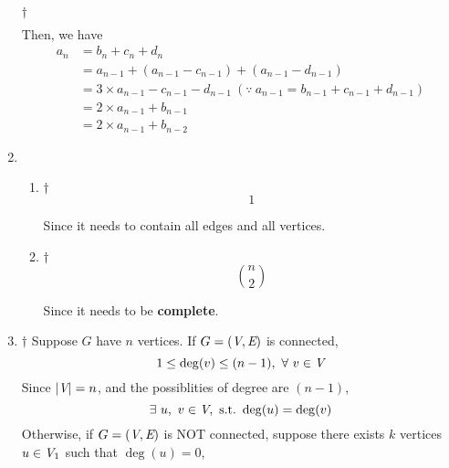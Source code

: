 \documentclass[a4paper,12pt]{article}
\begin{document}
\begin{enumerate}
\begin{answer}{$\dag$}
\begin{equation}
\begin{aligned}
            \end{aligned}
        \end{equation} Then, we have \begin{equation}
            \begin{aligned}
                a_n & = b_n + c_n + d_n \\
                & = a_{n - 1} + (a_{n - 1} - c_{n - 1}) + (a_{n - 1} - d_{n - 1}) \\
                & = 3 \times a_{n - 1} - c_{n - 1} - d_{n - 1} \ (\because \ a_{n - 1} = b_{n - 1} + c_{n - 1} + d_{n - 1}) \\
                & = 2 \times a_{n - 1} + b_{n - 1} \\
                & = 2 \times a_{n - 1} + b_{n - 2}
            \end{aligned}
        \end{equation}
    \end{answer}
    \item \quad \begin{enumerate}[label=(\alph*)]
        \item \begin{answer}{$\dag$}\begin{equation}
                1
            \end{equation} 
        \end{answer} Since it needs to contain all edges and all vertices.
        \item \begin{answer}{$\dag$}\begin{equation}
                \binom{n}{2}
            \end{equation} 
        \end{answer} Since it needs to be \textbf{complete}.
    \end{enumerate}
    \item \begin{answer}{$\dag$} Suppose $G$ have $n$ vertices. If $G = (\textit{V}, \textit{E})$ is connected, \begin{equation}
            1 \le \deg(v) \le (n - 1), \ \forall \ v \in \V
        \end{equation} Since $|\textit{V}| = n$, and the possiblities of degree are $(n - 1)$, \begin{equation}
            \exists \ u, \ v \in \V, \ \text{s.t.} \ \deg(u) = \deg(v)
        \end{equation} Otherwise, if $G = (\textit{V}, \textit{E})$ is NOT connected, suppose there exists $k$ vertices $u \in \textit{V}_1$ such that $\deg(u) = 0$, 

\end{answer}
\end{enumerate}
\end{document}
